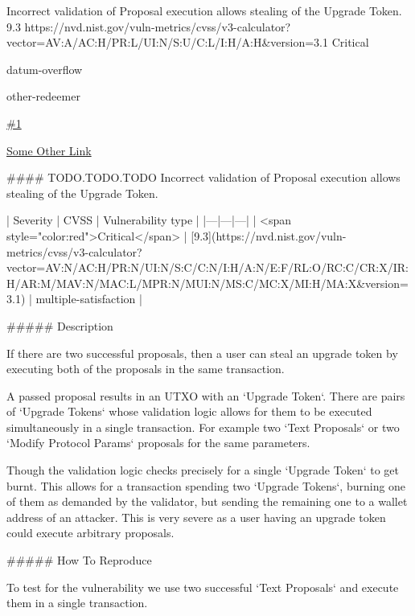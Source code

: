 \vuln
    { %
    Incorrect validation of Proposal execution allows stealing of the Upgrade Token.
    }
    { %
      9.3
    }
    { %
      https://nvd.nist.gov/vuln-metrics/cvss/v3-calculator?vector=AV:A/AC:H/PR:L/UI:N/S:U/C:L/I:H/A:H&version=3.1
    }
    { %
    Critical
    }
    { %
    \item datum-overflow
    \item other-redeemer
    }
    { %
      \lipsum[2]
    }
    { %
      \lipsum[1]
    }
    { %
      \lipsum[1]
    }
    { %
    \item\href{github.com}{\#1}
    \item\href{github.com}{Some Other Link}
    }



#### TODO.TODO.TODO Incorrect validation of Proposal execution allows stealing of the Upgrade Token.

| Severity | CVSS | Vulnerability type |
|---|---|---|
| <span style="color:red">Critical</span> | [9.3](https://nvd.nist.gov/vuln-metrics/cvss/v3-calculator?vector=AV:N/AC:H/PR:N/UI:N/S:C/C:N/I:H/A:N/E:F/RL:O/RC:C/CR:X/IR:H/AR:M/MAV:N/MAC:L/MPR:N/MUI:N/MS:C/MC:X/MI:H/MA:X&version=3.1) | multiple-satisfaction |

##### Description

If there are two successful proposals, then a user can steal an upgrade token by executing both of the proposals in the same transaction. 

A passed proposal results in an UTXO with an `Upgrade Token`. There are pairs of `Upgrade Tokens` whose validation logic allows for them to be executed simultaneously in a single transaction. For example two `Text Proposals` or two `Modify Protocol Params` proposals for the same parameters.

Though the validation logic checks precisely for a single `Upgrade Token` to get burnt. This allows for a transaction spending two `Upgrade Tokens`, burning one of them as demanded by the validator, but sending the remaining one to a wallet address of an attacker. This is very severe as a user having an upgrade token could execute arbitrary proposals.

##### How To Reproduce

To test for the vulnerability we use two successful `Text Proposals` and execute them in a single transaction. 

